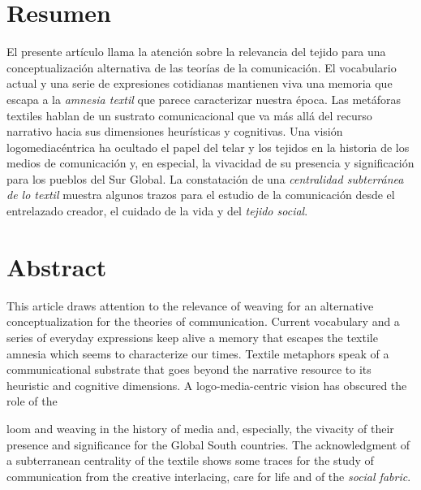 \documentclass{tufte-handout}
\begin{document}
\begin{titlepage}
\vspace*{2.5em}


\hypertarget{resumen}{%
\section{Resumen}\label{resumen}}

El presente artículo llama la atención sobre la relevancia del tejido
para una conceptualización alternativa de las teorías de la
comunicación. El vocabulario actual y una serie de expresiones
cotidianas mantienen viva una memoria que escapa a la \emph{amnesia
textil} que parece caracterizar nuestra época. Las metáforas textiles
hablan de un sustrato comunicacional que va más allá del recurso
narrativo hacia sus dimensiones heurísticas y cognitivas. Una visión
logomediacéntrica ha ocultado el papel del telar y los tejidos en la
historia de los medios de comunicación y, en especial, la vivacidad de
su presencia y significación para los pueblos del Sur Global. La
constatación de una \emph{centralidad subterránea de lo textil} muestra
algunos trazos para el estudio de la comunicación desde el entrelazado
creador, el cuidado de la vida y del \emph{tejido social}.

\hypertarget{abstract}{%
\section{Abstract}\label{abstract}}

This article draws attention to the relevance of weaving for an
alternative conceptualization for the theories of communication. Current
vocabulary and a series of everyday expressions keep alive a memory that
escapes the textile amnesia which seems to characterize our times.
Textile metaphors speak of a communicational substrate that goes beyond
the narrative resource to its heuristic and cognitive dimensions. A logo-media-centric vision has obscured the role of the

\enlargethispage{2\baselineskip}

\vspace*{2em}



 \end{titlepage}


\noindent loom and weaving
in the history of media and, especially, the vivacity of their presence
and significance for the Global South countries. The acknowledgment of a
subterranean centrality of the textile shows some traces for the study
of communication from the creative interlacing, care for life and of the
\emph{social fabric}.
\end{document}
